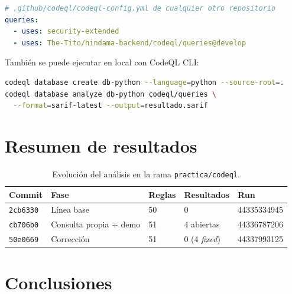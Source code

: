 \documentclass[11pt,a4paper]{article}
\newcommand{\cod}[1]{\texttt{#1}}
\begin{document}
\par\noindent\begin{minipage}{\linewidth}
\begin{lstlisting}[language=yaml,caption={Uso de la consulta desde otro repositorio.}]
# .github/codeql/codeql-config.yml de cualquier otro repositorio
queries:
  - uses: security-extended
  - uses: The-Tito/hindama-backend/codeql/queries@develop
\end{lstlisting}
\end{minipage}\par

También se puede ejecutar en local con CodeQL CLI:

\par\noindent\begin{minipage}{\linewidth}
\begin{lstlisting}[language=bash,caption={Ejecución local con CodeQL CLI.}]
codeql database create db-python --language=python --source-root=.
codeql database analyze db-python codeql/queries \
  --format=sarif-latest --output=resultado.sarif
\end{lstlisting}
\end{minipage}\par

\section{Resumen de resultados}

\begin{table}[H]\centering
\caption{Evolución del análisis en la rama \texttt{practica/codeql}.}
\begin{tabularx}{\linewidth}{@{}p{1.8cm}Lp{1.4cm}p{2.6cm}p{2.6cm}@{}}
\toprule
\textbf{Commit} & \textbf{Fase} & \textbf{Reglas} & \textbf{Resultados} & \textbf{Run} \\ \midrule
\cod{2cb6330} & Línea base & 50 & 0 & 44335334945 \\
\cod{cb706b0} & Consulta propia + demo & 51 & 4 abiertas & 44336787206 \\
\cod{50e0669} & Corrección & 51 & 0 (4 \emph{fixed}) & 44337993125 \\ \bottomrule
\end{tabularx}
\end{table}

\section{Conclusiones}
\end{document}
